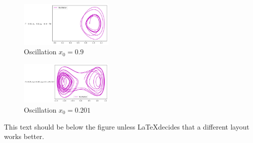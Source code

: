 \documentclass[aps,pra,notitlepage,amsmath,amssymb,letterpaper,12pt]{revtex4-1}
\begin{document}
\begin{figure}[h!] %
  \includegraphics[width=0.4\textwidth]{0.9.png}  %
  \caption{Oscillation $x_0=0.9$}
  \label{fig:figlabel}
\end{figure}

\begin{figure}[h!] %
  \includegraphics[width=0.4\textwidth]{0.201.png}  %
  \caption{Oscillation $x_0=0.201$}
  \label{fig:figlabel}
\end{figure}

This text should be below the figure unless \LaTeX  decides that a different layout works better.
 
 
\end{document}
